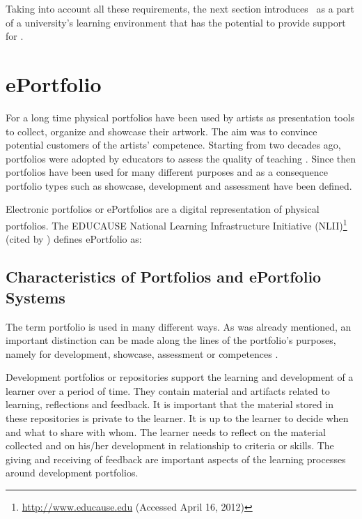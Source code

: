 Taking into account all these requirements, the next section introduces \ep~as a
part of a university's learning environment that has the potential to provide
support for \LLLsn.

\section{ePortfolio}
For a long time physical portfolios have been used by artists as presentation
tools to collect, organize and showcase their artwork. The aim was to convince
potential customers of the artists' competence. Starting from two decades ago,
portfolios were adopted by educators to assess the quality of teaching
\citep{VanTartwijkJ.2004}. Since then portfolios have been used for many
different purposes and as a consequence portfolio types such as showcase,
development and assessment have been defined.
 
Electronic portfolios or ePortfolios are a digital representation of physical
portfolios. The EDUCAUSE National Learning Infrastructure Initiative
(NLII)\footnote{\url{http://www.educause.edu} (Accessed April 16, 2012)} (cited
by \citealp{IMSGlobalLearningConsortium2005}) defines ePortfolio as:


\subsection{Characteristics of Portfolios and ePortfolio Systems}
\label{sec:charep}
The term portfolio is used in many different ways. As was already mentioned, an
important distinction can be made along the lines of the portfolio's purposes,
namely for development, showcase, assessment or competences
\citep{VanTartwijkJ.2004}.

Development portfolios or repositories support the learning and development of a
learner over a period of time. They contain material and artifacts related to
learning, reflections and feedback. It is important that the material stored in
these repositories is private to the learner. It is up to the learner to decide
when and what to share with whom. The learner needs to reflect on the material
collected and on his/her development in relationship to criteria or skills. The
giving and receiving of feedback are important aspects of the learning processes
around development portfolios.

